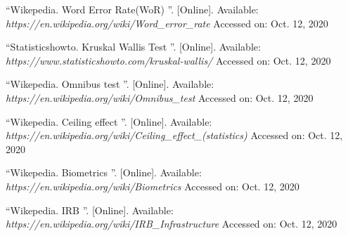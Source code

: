 \documentclass[12pt,a4paper,oneside]{report}
\begin{document}
\begin{thebibliography}{999}

 	 {{\textquotedblleft Wikepedia. Word Error Rate(WoR) \textquotedblright}. [Online]. Available:\\ \textit{https://en.wikipedia.org/wiki/Word_error_rate} Accessed on: Oct. 12, 2020}

 	 {{\textquotedblleft Statisticshowto. Kruskal Wallis Test \textquotedblright}. [Online]. Available:\\ \textit{https://www.statisticshowto.com/kruskal-wallis/} Accessed on: Oct. 12, 2020}

 	 {{\textquotedblleft Wikepedia. Omnibus test \textquotedblright}. [Online]. Available:\\ \textit{https://en.wikipedia.org/wiki/Omnibus_test} Accessed on: Oct. 12, 2020}

 	 {{\textquotedblleft Wikepedia. Ceiling effect \textquotedblright}. [Online]. Available:\\ \textit{https://en.wikipedia.org/wiki/Ceiling_effect_(statistics)} Accessed on: Oct. 12, 2020}

 	 {{\textquotedblleft Wikepedia. Biometrics \textquotedblright}. [Online]. Available:\\ \textit{https://en.wikipedia.org/wiki/Biometrics} Accessed on: Oct. 12, 2020}

 	 {{\textquotedblleft Wikepedia. IRB \textquotedblright}. [Online]. Available:\\ \textit{https://en.wikipedia.org/wiki/IRB_Infrastructure} Accessed on: Oct. 12, 2020}



\end{thebibliography}
\end{document}
